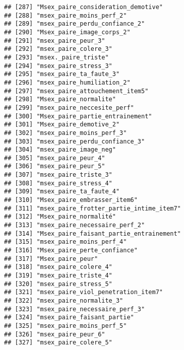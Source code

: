 \documentclass[
]{article}
\begin{document}
\begin{verbatim}
## [287] "Msex_paire_consideration_demotive"                   
## [288] "msex_paire_moins_perf_2"                             
## [289] "msex_paire_perdu_confiance_2"                        
## [290] "Msex_paire_image_corps_2"                            
## [291] "msex_paire_peur_3"                                   
## [292] "msex_paire_colere_3"                                 
## [293] "msex._paire_triste"                                  
## [294] "msex_paire_stress_3"                                 
## [295] "msex_paire_ta_faute_3"                               
## [296] "msex_paire_humiliation_2"                            
## [297] "msex_paire_attouchement_item5"                       
## [298] "Msex_paire_normalite"                                
## [299] "msex_paire_neccesite_perf"                           
## [300] "Msex_paire_partie_entrainement"                      
## [301] "Msex_paire_demotive_2"                               
## [302] "msex_paire_moins_perf_3"                             
## [303] "msex_paire_perdu_confiance_3"                        
## [304] "msex_paire_image_neg"                                
## [305] "msex_paire_peur_4"                                   
## [306] "msex_paire_peur_5"                                   
## [307] "msex_paire_triste_3"                                 
## [308] "msex_paire_stress_4"                                 
## [309] "msex_paire_ta_faute_4"                               
## [310] "Msex_paire_embrasser_item6"                          
## [311] "msex_paire_frotter_partie_intime_item7"              
## [312] "Msex_paire_normalité"                                
## [313] "msex_paire_necessaire_perf_2"                        
## [314] "Msex_paire_faisant_partie_entrainement"              
## [315] "msex_paire_moins_perf_4"                             
## [316] "Msex_paire_perte_confiance"                          
## [317] "Msex_paire_peur"                                     
## [318] "msex_paire_colere_4"                                 
## [319] "msex_paire_triste_4"                                 
## [320] "msex_paire_stress_5"                                 
## [321] "msex_paire_viol_penetration_item7"                   
## [322] "msex_paire_normalite_3"                              
## [323] "msex_paire_necessaire_perf_3"                        
## [324] "msex_paire_faisant_partie"                           
## [325] "msex_paire_moins_perf_5"                             
## [326] "msex_paire_peur_6"                                   
## [327] "msex_paire_colere_5"                                 

\end{verbatim}
\end{document}
